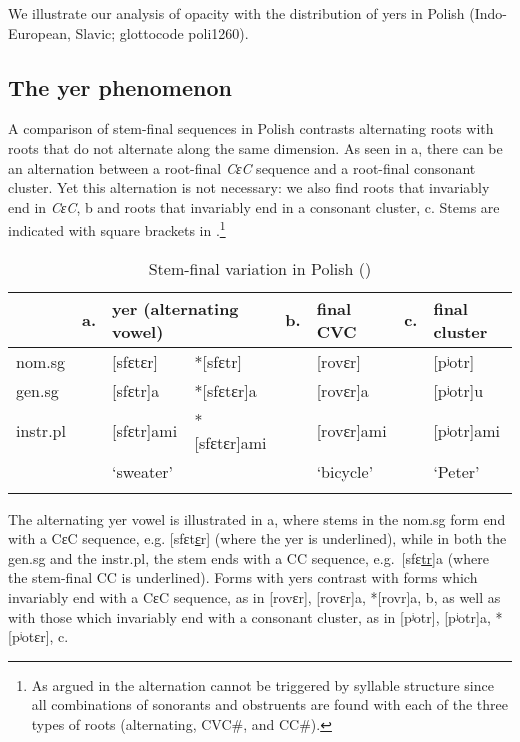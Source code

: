 We illustrate our analysis of opacity with the distribution of yers  in Polish (Indo-European, Slavic; glottocode poli1260). 

\subsection{The yer phenomenon}

A comparison of stem-final sequences in Polish contrasts alternating roots with roots that do not alternate along the same dimension. As seen in a, there can be an alternation between a root-final {\it CɛC} sequence and a root-final consonant cluster. Yet this alternation is not necessary: we also find roots that invariably end in {\it CɛC}, b and roots that invariably end in a consonant cluster, c.  Stems are indicated with square brackets in .\footnote{As argued in \citet{Szpyra:1992}  the alternation cannot be triggered by syllable structure since all combinations of sonorants and obstruents are found with each of   the three types of roots (alternating, CVC\#, and CC\#).}


\begin{table}
\caption{Stem-final variation in Polish (\citealt[181]{Jarosz:2005_BLS})\label{Polish_yer_data}}
\begin{tabular}{l lll l@{~}l l@{~}l}
\lsptoprule
			  &a.	&\multicolumn{2}{l}{yer (alternating vowel)}	&b.	&final CVC	&c.	&final cluster\\\midrule
{\sc nom.sg}  &	    &[sfɛtɛr]	&*[sfɛtr]		&	&[rovɛr]				&	&[pʲotr]\\
{\sc gen.sg}  &	    &[sfɛtr]a	&*[sfɛtɛr]a		&	&[rovɛr]a				&	&[pʲotr]u\\
{\sc instr.pl}&	    &[sfɛtr]ami	&*[sfɛtɛr]ami		&	&[rovɛr]ami				&	&[pʲotr]ami\\
			  &	    &`sweater'	&		&	&`bicycle'				&	&`Peter'\\
\lspbottomrule
\end{tabular}
\end{table}


The alternating  yer vowel is illustrated in a, where stems in the {\sc nom.sg} form end with a CɛC sequence,  e.g. [sfɛt\uline{ɛ}r] (where the  yer is underlined), while in both the {\sc gen.sg} and the {\sc instr.pl}, the stem ends with a CC sequence, e.g.\ [sfɛ\uline{tr}]a (where the stem-final CC is underlined). Forms with yers  contrast with forms which invariably end with a CɛC sequence, as in [rovɛr], [rovɛr]a, *[rovr]a, b, as well as with those which invariably end with a consonant cluster, as in  [pʲotr], [pʲotr]a, *[pʲotɛr], c.

